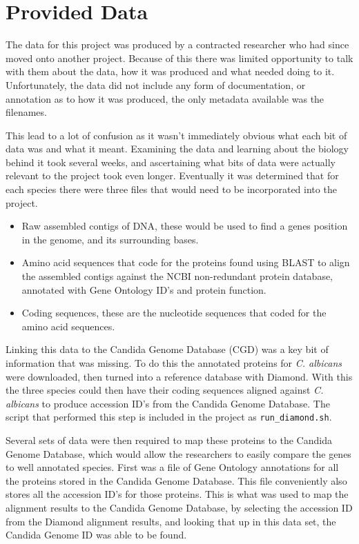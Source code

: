 \section{Provided Data}
The data for this project was produced by a contracted researcher who had since moved onto another project. Because of this there was limited opportunity to talk with them about the data, how it was produced and what needed doing to it. Unfortunately, the data did not include any form of documentation, or annotation as to how it was produced, the only metadata available was the filenames. 

This lead to a lot of confusion as it wasn't immediately obvious what each bit of data was and what it meant. Examining the data and learning about the biology behind it took several weeks, and ascertaining what bits of data were actually relevant to the project took even longer. Eventually it was determined that for each species there were three files that would need to be incorporated into the project.

\begin{itemize}
  \item Raw assembled contigs of DNA, these would be used to find a genes position in the genome, and its surrounding bases. 
  \item Amino acid sequences that code for the proteins found using BLAST to align the assembled contigs against the NCBI non-redundant protein database, annotated with Gene Ontology ID's and protein function.
  \item Coding sequences, these are the nucleotide sequences that coded for the amino acid sequences. 
\end{itemize}

Linking this data to the Candida Genome Database (CGD) was a key bit of information that was missing. To do this the annotated proteins\cite{albicans} for \textit{C. albicans} were downloaded, then turned into a reference database with Diamond. With this the three species could then have their coding sequences aligned against \textit{C. albicans} to produce accession ID's from the Candida Genome Database. The script that performed this step is included in the project as \texttt{run\_diamond.sh}.

Several sets of data were then required to map these proteins to the Candida Genome Database, which would allow the researchers to easily compare the genes to well annotated species. First was a file of Gene Ontology\cite{geneontology} annotations for all the proteins stored in the Candida Genome Database\cite{cgd-proteins}. This file conveniently also stores all the accession ID's for those proteins. This is what was used to map the alignment results to the Candida Genome Database, by selecting the accession ID from the Diamond alignment results, and looking that up in this data set, the Candida Genome ID was able to be found.

